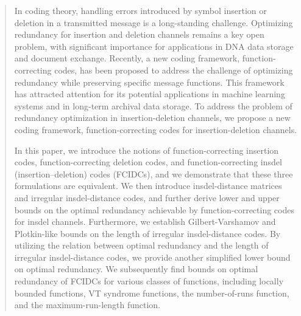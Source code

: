 \documentclass[11 pt]{article}
\numberwithin{equation}{section}
\begin{document}







\maketitle

\begin{abstract}

In coding theory, handling errors introduced by symbol insertion or deletion in a transmitted message is a long-standing challenge. Optimizing redundancy for insertion and deletion channels remains a key open problem, with significant importance for applications in DNA data storage and document exchange. Recently, a new coding framework, function-correcting codes, has been proposed to address the challenge of optimizing redundancy while preserving specific message functions. This framework has attracted attention for its potential applications in machine learning systems and in long-term archival data storage. To address the problem of redundancy optimization in insertion-deletion channels, we propose a new coding framework, function-correcting codes for insertion-deletion channels.

In this paper, we introduce the notions of function-correcting insertion codes, function-correcting deletion codes, and function-correcting insdel (insertion–deletion) codes (FCIDCs), and we demonstrate that these three formulations are equivalent. We then introduce insdel-distance matrices and irregular insdel-distance codes, and further derive lower and upper bounds on the optimal redundancy achievable by function-correcting codes for insdel channels. Furthermore, we establish Gilbert-Varshamov and Plotkin-like bounds on the length of irregular insdel-distance codes. By utilizing the relation between optimal redundancy and the length of irregular insdel-distance codes, we provide another simplified lower bound on optimal redundancy. We subsequently find bounds on optimal redundancy of FCIDCs for various classes of functions, including locally bounded functions, VT syndrome functions, the number-of-runs function, and the maximum-run-length function.
\end{abstract}
\end{document}

